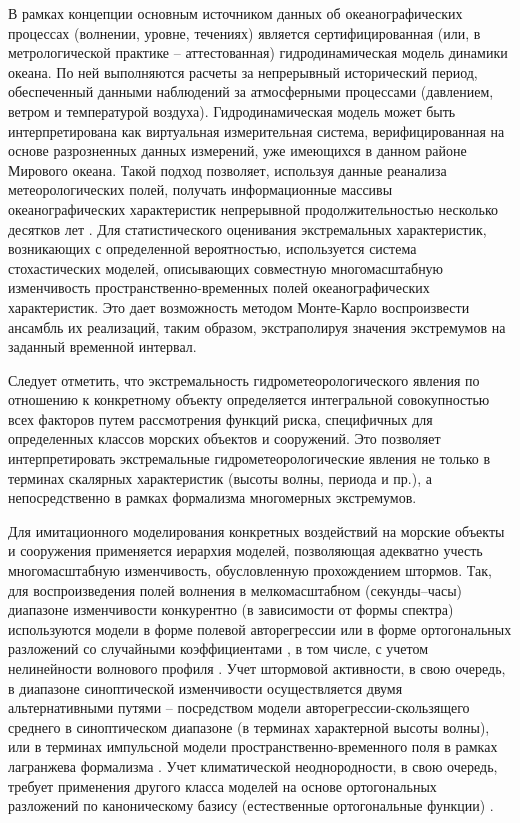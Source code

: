В рамках концепции \citep{dk3} основным источником данных об океанографических процессах (волнении, уровне, течениях) является сертифицированная (или, в метрологической практике – аттестованная) гидродинамическая модель динамики океана. По ней выполняются расчеты за непрерывный исторический период, обеспеченный данными наблюдений за атмосферными процессами (давлением, ветром и температурой воздуха). Гидродинамическая модель может быть интерпретирована как виртуальная измерительная система, верифицированная на основе разрозненных данных измерений, уже имеющихся в данном районе Мирового океана. Такой подход позволяет, используя данные реанализа метеорологических полей, получать информационные массивы океанографических характеристик непрерывной продолжительностью несколько десятков лет \citep{dk4}. Для статистического оценивания экстремальных характеристик, возникающих с определенной вероятностью, используется система стохастических моделей, описывающих совместную многомасштабную изменчивость пространственно-временных полей океанографических характеристик. Это дает возможность методом Монте-Карло воспроизвести ансамбль их реализаций, таким образом, экстраполируя значения экстремумов на заданный временной интервал.

Следует отметить, что экстремальность гидрометеорологического явления по отношению к конкретному объекту определяется интегральной совокупностью всех факторов путем рассмотрения функций риска, специфичных для определенных классов морских объектов и сооружений. Это позволяет интерпретировать экстремальные гидрометеорологические явления не только в терминах скалярных характеристик (высоты волны, периода и пр.), а непосредственно в рамках формализма многомерных экстремумов.

Для имитационного моделирования конкретных воздействий на морские объекты и сооружения применяется иерархия моделей, позволяющая адекватно учесть многомасштабную изменчивость, обусловленную прохождением штормов. Так, для воспроизведения полей волнения в мелкомасштабном (секунды--часы) диапазоне изменчивости конкурентно (в зависимости от формы спектра) используются модели в форме полевой авторегрессии \citep{dk6} или в форме ортогональных разложений со случайными коэффициентами \citep{dk7}, в том числе, с учетом нелинейности волнового профиля \citep{dk8}. Учет штормовой активности, в свою очередь, в диапазоне синоптической изменчивости осуществляется двумя альтернативными путями – посредством модели авторегрессии-скользящего среднего \citep{dk9} в синоптическом диапазоне (в терминах характерной высоты волны), или в терминах импульсной модели пространственно-временного поля в рамках лагранжева формализма \citep{dk10}. Учет климатической неоднородности, в свою очередь, требует применения другого класса моделей на основе ортогональных разложений по каноническому базису (естественные ортогональные функции) \citep{dk11}.

